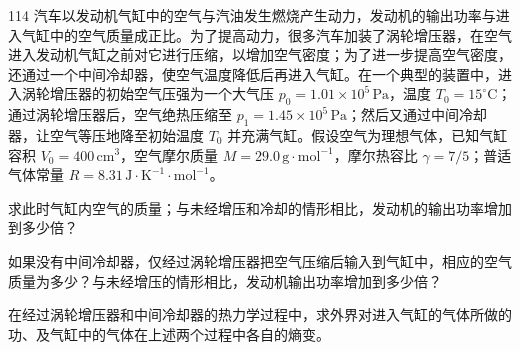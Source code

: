 \begin{problem}[第36届全国中学生物理竞赛决赛][涡轮增压器热力学过程]{114}
    汽车以发动机气缸中的空气与汽油发生燃烧产生动力，发动机的输出功率与进入气缸中的空气质量成正比。为了提高动力，很多汽车加装了涡轮增压器，在空气进入发动机气缸之前对它进行压缩，以增加空气密度；为了进一步提高空气密度，还通过一个中间冷却器，使空气温度降低后再进入气缸。在一个典型的装置中，进入涡轮增压器的初始空气压强为一个大气压 $p_{0} = 1.01 \times 10^{5} \,\mathrm{Pa}$，温度 $T_{0} = 15^{\circ}\mathrm{C}$；通过涡轮增压器后，空气绝热压缩至 $p_{1} = 1.45 \times 10^{5} \,\mathrm{Pa}$；然后又通过中间冷却器，让空气等压地降至初始温度 $T_{0}$ 并充满气缸。假设空气为理想气体，已知气缸容积 $V_{0} = 400 \,\mathrm{cm}^{3}$，空气摩尔质量 $M = 29.0 \,\mathrm{g} \cdot \mathrm{mol}^{-1}$，摩尔热容比 $\gamma = 7/5$；普适气体常量 $R = 8.31 \,\mathrm{J} \cdot \mathrm{K}^{-1} \cdot \mathrm{mol}^{-1}$。
    \begin{subproblem}
        求此时气缸内空气的质量；与未经增压和冷却的情形相比，发动机的输出功率增加到多少倍？
    \end{subproblem}
    \begin{subproblem}
        如果没有中间冷却器，仅经过涡轮增压器把空气压缩后输入到气缸中，相应的空气质量为多少？与未经增压的情形相比，发动机输出功率增加到多少倍？
    \end{subproblem}
    \begin{subproblem}
        在经过涡轮增压器和中间冷却器的热力学过程中，求外界对进入气缸的气体所做的功、及气缸中的气体在上述两个过程中各自的熵变。
    \end{subproblem}
\end{problem}